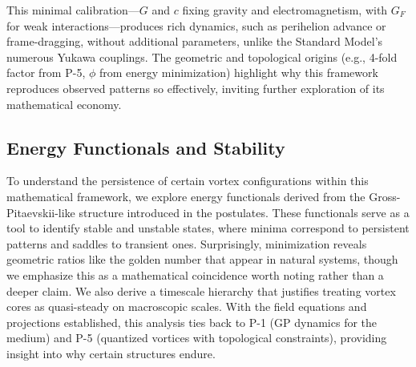 This minimal calibration---$G$ and $c$ fixing gravity and electromagnetism, with $G_F$ for weak interactions---produces rich dynamics, such as perihelion advance or frame-dragging, without additional parameters, unlike the Standard Model’s numerous Yukawa couplings. The geometric and topological origins (e.g., 4-fold factor from P-5, $\phi$ from energy minimization) highlight why this framework reproduces observed patterns so effectively, inviting further exploration of its mathematical economy.


\subsection{Energy Functionals and Stability}

To understand the persistence of certain vortex configurations within this mathematical framework, we explore energy functionals derived from the Gross-Pitaevskii-like structure introduced in the postulates. These functionals serve as a tool to identify stable and unstable states, where minima correspond to persistent patterns and saddles to transient ones. Surprisingly, minimization reveals geometric ratios like the golden number that appear in natural systems, though we emphasize this as a mathematical coincidence worth noting rather than a deeper claim. We also derive a timescale hierarchy that justifies treating vortex cores as quasi-steady on macroscopic scales. With the field equations and projections established, this analysis ties back to P-1 (GP dynamics for the medium) and P-5 (quantized vortices with topological constraints), providing insight into why certain structures endure.

